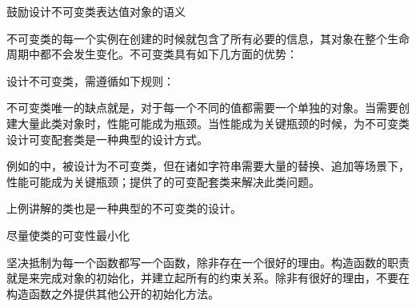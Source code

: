 \begin{content}

\begin{advise}
鼓励设计不可变类表达值对象的语义
\end{advise}

不可变类的每一个实例在创建的时候就包含了所有必要的信息，其对象在整个生命周期中都不会发生变化。不可变类具有如下几方面的优势：
\begin{enum}
\end{enum}

设计不可变类，需遵循如下规则：
\begin{enum}
\end{enum}

不可变类唯一的缺点就是，对于每一个不同的值都需要一个单独的对象。当需要创建大量此类对象时，性能可能成为瓶颈。当性能成为关键瓶颈的时候，为不可变类设计可变配套类是一种典型的设计方式。

例如的中，被设计为不可变类，但在诸如字符串需要大量的替换、追加等场景下，性能可能成为关键瓶颈；提供了的可变配套类来解决此类问题。

上例讲解的类也是一种典型的不可变类的设计。

\begin{regulation}
尽量使类的可变性最小化
\end{regulation}

坚决抵制为每一个函数都写一个函数，除非存在一个很好的理由。构造函数的职责就是来完成对象的初始化，并建立起所有的约束关系。除非有很好的理由，不要在构造函数之外提供其他公开的初始化方法。

\end{content}

